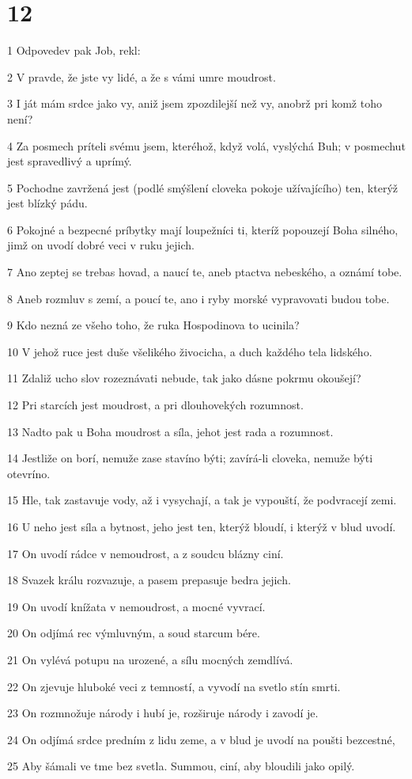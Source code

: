 \chapter{12}

\par 1 Odpovedev pak Job, rekl:
\par 2 V pravde, že jste vy lidé, a že s vámi umre moudrost.
\par 3 I ját mám srdce jako vy, aniž jsem zpozdilejší než vy, anobrž pri komž toho není?
\par 4 Za posmech príteli svému jsem, kteréhož, když volá, vyslýchá Buh; v posmechut jest spravedlivý a uprímý.
\par 5 Pochodne zavržená jest (podlé smýšlení cloveka pokoje užívajícího) ten, kterýž jest blízký pádu.
\par 6 Pokojné a bezpecné príbytky mají loupežníci ti, kteríž popouzejí Boha silného, jimž on uvodí dobré veci v ruku jejich.
\par 7 Ano zeptej se trebas hovad, a naucí te, aneb ptactva nebeského, a oznámí tobe.
\par 8 Aneb rozmluv s zemí, a poucí te, ano i ryby morské vypravovati budou tobe.
\par 9 Kdo nezná ze všeho toho, že ruka Hospodinova to ucinila?
\par 10 V jehož ruce jest duše všelikého živocicha, a duch každého tela lidského.
\par 11 Zdaliž ucho slov rozeznávati nebude, tak jako dásne pokrmu okoušejí?
\par 12 Pri starcích jest moudrost, a pri dlouhovekých rozumnost.
\par 13 Nadto pak u Boha moudrost a síla, jehot jest rada a rozumnost.
\par 14 Jestliže on borí, nemuže zase stavíno býti; zavírá-li cloveka, nemuže býti otevríno.
\par 15 Hle, tak zastavuje vody, až i vysychají, a tak je vypouští, že podvracejí zemi.
\par 16 U neho jest síla a bytnost, jeho jest ten, kterýž bloudí, i kterýž v blud uvodí.
\par 17 On uvodí rádce v nemoudrost, a z soudcu blázny ciní.
\par 18 Svazek králu rozvazuje, a pasem prepasuje bedra jejich.
\par 19 On uvodí knížata v nemoudrost, a mocné vyvrací.
\par 20 On odjímá rec výmluvným, a soud starcum bére.
\par 21 On vylévá potupu na urozené, a sílu mocných zemdlívá.
\par 22 On zjevuje hluboké veci z temností, a vyvodí na svetlo stín smrti.
\par 23 On rozmnožuje národy i hubí je, rozširuje národy i zavodí je.
\par 24 On odjímá srdce predním z lidu zeme, a v blud je uvodí na poušti bezcestné,
\par 25 Aby šámali ve tme bez svetla. Summou, ciní, aby bloudili jako opilý.

